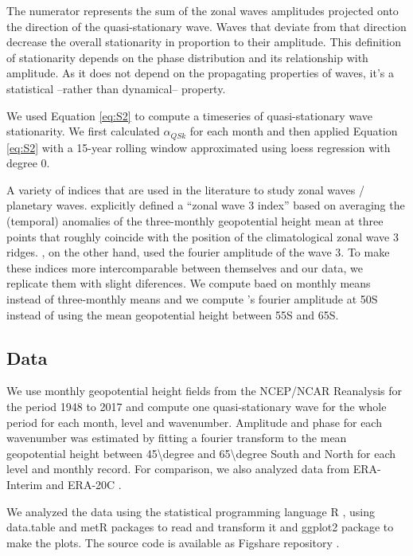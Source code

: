 \documentclass[draft,linenumbers]{agujournal2018}
\begin{document}
The numerator represents the sum of the zonal waves amplitudes projected
onto the direction of the quasi-stationary wave. Waves that deviate from
that direction decrease the overall stationarity in proportion to their
amplitude. This definition of stationarity depends on the phase
distribution and its relationship with amplitude. As it does not depend
on the propagating properties of waves, it's a statistical --rather than
dynamical-- property.

We used Equation \ref{eq:S2} to compute a timeseries of quasi-stationary
wave stationarity. We first calculated \(\alpha_{QSk}\) for each month
and then applied Equation \ref{eq:S2} with a 15-year rolling window
approximated using loess regression with degree 0.

A variety of indices that are used in the literature to study zonal
waves / planetary waves. \citet{raphael2004} explicitly defined a
``zonal wave 3 index'' based on averaging the (temporal) anomalies of
the three-monthly geopotential height mean at three points that roughly
coincide with the position of the climatological zonal wave 3 ridges.
\citet{turner2017}, on the other hand, used the fourier amplitude of the
wave 3. To make these indices more intercomparable between themselves
and our data, we replicate them with slight diferences. We compute
\citet{raphael2004} baed on monthly means instead of three-monthly means
and we compute \citet{turner2017}'s fourier amplitude at 50S instead of
using the mean geopotential height between 55S and 65S.

\subsection{Data}

We use monthly geopotential height fields from the NCEP/NCAR Reanalysis
\citep{kalnay1996} for the period 1948 to 2017 and compute one
quasi-stationary wave for the whole period for each month, level and
wavenumber. Amplitude and phase for each wavenumber was estimated by
fitting a fourier transform to the mean geopotential height between
45\textbackslash degree and 65\textbackslash degree South and North for
each level and monthly record. For comparison, we also analyzed data
from ERA-Interim \citep{dee2011} and ERA-20C \citep{poli2016}.

We analyzed the data using the statistical programming language R
\citep{R-base}, using data.table \citep{R-data.table} and metR
\citep{R-metR} packages to read and transform it and ggplot2 package
\citep{R-ggplot2} to make the plots. The source code is available as
Figshare repository \citep{Campitelli2019-figshare}.
\end{document}
